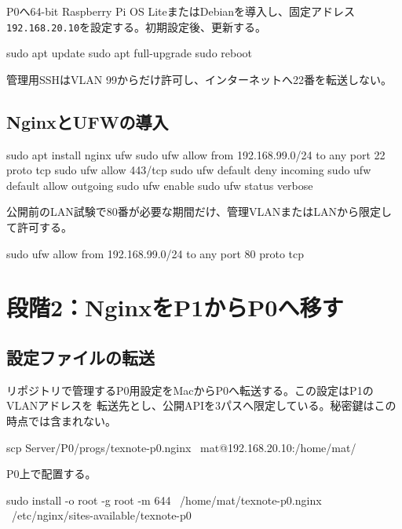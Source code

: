 \documentclass[uplatex,a4paper,11pt]{jsarticle}
\begin{document}
P0へ64-bit Raspberry Pi OS LiteまたはDebianを導入し、固定アドレス
\texttt{192.168.20.10}を設定する。初期設定後、更新する。

\begin{command}
sudo apt update
sudo apt full-upgrade
sudo reboot
\end{command}

管理用SSHはVLAN 99からだけ許可し、インターネットへ22番を転送しない。

\subsection{NginxとUFWの導入}

\begin{command}
sudo apt install nginx ufw
sudo ufw allow from 192.168.99.0/24 to any port 22 proto tcp
sudo ufw allow 443/tcp
sudo ufw default deny incoming
sudo ufw default allow outgoing
sudo ufw enable
sudo ufw status verbose
\end{command}

公開前のLAN試験で80番が必要な期間だけ、管理VLANまたはLANから限定して許可する。

\begin{command}
sudo ufw allow from 192.168.99.0/24 to any port 80 proto tcp
\end{command}

\section{段階2：NginxをP1からP0へ移す}

\subsection{設定ファイルの転送}

リポジトリで管理するP0用設定をMacからP0へ転送する。この設定はP1のVLANアドレスを
転送先とし、公開APIを3パスへ限定している。秘密鍵はこの時点では含まれない。

\begin{command}
scp Server/P0/progs/texnote-p0.nginx \
  mat@192.168.20.10:/home/mat/
\end{command}

P0上で配置する。

\begin{command}
sudo install -o root -g root -m 644 \
  /home/mat/texnote-p0.nginx \
  /etc/nginx/sites-available/texnote-p0
\end{command}
\end{document}

